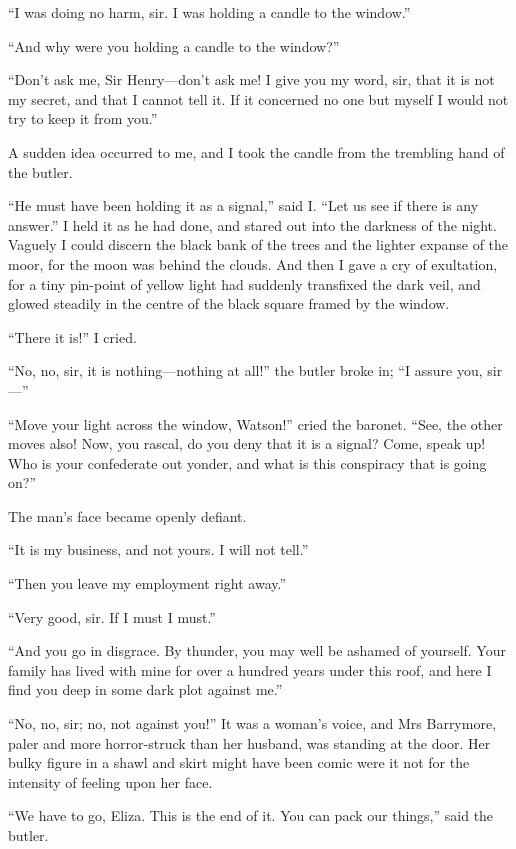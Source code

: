 \documentclass[paper=a5,BCOR=7mm,twoside,DIV=calc,12pt,usegeometry,openany,chapterprefix,endperiod,headings=big]{scrbook} %
\begin{document}
\enquote{I was doing no harm, sir. I was holding a candle to the window.}

\enquote{And why were you holding a candle to the window?}

\enquote{Don't ask me, Sir Henry---don't ask me! I give you my word, sir, that it is not my secret, and that I cannot tell it. If it concerned no one but myself I would not try to keep it from you.}

A sudden idea occurred to me, and I took the candle from the trembling hand of the butler.

\enquote{He must have been holding it as a signal,} said I. \enquote{Let us see if there is any answer.} I held it as he had done, and stared out into the darkness of the night. Vaguely I could discern the black bank of the trees and the lighter expanse of the moor, for the moon was behind the clouds. And then I gave a cry of exultation, for a tiny pin-point of yellow light had suddenly transfixed the dark veil, and glowed steadily in the centre of the black square framed by the window.

\enquote{There it is!} I cried.

\enquote{No, no, sir, it is nothing---nothing at all!} the butler broke in; \enquote{I assure you, sir---}

\enquote{Move your light across the window, Watson!} cried the baronet. \enquote{See, the other moves also! Now, you rascal, do you deny that it is a signal? Come, speak up! Who is your confederate out yonder, and what is this conspiracy that is going on?}

The man's face became openly defiant.

\enquote{It is my business, and not yours. I will not tell.}

\enquote{Then you leave my employment right away.}

\enquote{Very good, sir. If I must I must.}

\enquote{And you go in disgrace. By thunder, you may well be ashamed of yourself. Your family has lived with mine for over a hundred years under this roof, and here I find you deep in some dark plot against me.}

\enquote{No, no, sir; no, not against you!} It was a woman's voice, and Mrs Barrymore, paler and more horror-struck than her husband, was standing at the door. Her bulky figure in a shawl and skirt might have been comic were it not for the intensity of feeling upon her face.

\enquote{We have to go, Eliza. This is the end of it. You can pack our things,} said the butler.
\end{document}
